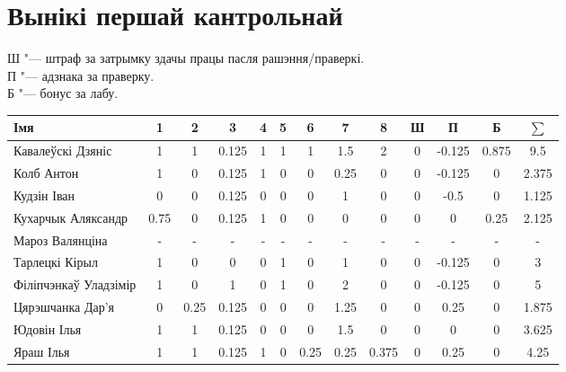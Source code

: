 


	\section{Вынікі першай кантрольнай}
	\noindent Ш "--- штраф за затрымку здачы працы пасля рашэння/праверкі. \\
	П "--- адзнака за праверку. \\
	Б "--- бонус за лабу.
\begin{table}[H]
	\begin{tabular}{|l|c|c|c|c|c|c|c|c|c|c|c|c|}
		\hline
		Імя                 & 1 & 2   & 3   & 4    & 5    & 6 & 7   & 8    & Ш   & П    & Б    & $\sum$ \\ \hline
		Кавалеўскі Дзяніс & 1 & 1 & 0.125 & 1 & 1 & 1 & 1.5 & 2 & 0  & -0.125 & 0.875 & 9.5 \\ \hline
		Колб Антон & 1 & 0 & 0.125 & 1 & 0 & 0 & 0.25 & 0 & 0 & -0.125 & 0 & 2.375 \\ \hline
		Кудзін Іван & 0 & 0 & 0.125 & 0 & 0 & 0 & 1 & 0 & 0 & -0.5 & 0 & 1.125 \\ \hline
		Кухарчык Аляксандр & 0.75 & 0 & 0.125 & 1 & 0 & 0 & 0 & 0 & 0 & 0 & 0.25 & 2.125 \\ \hline
		Мароз Валянціна & - & - & - & - & - & - & - & - & - & - & - & - \\ \hline
		Тарлецкі Кірыл & 1 & 0 & 0 & 0 & 1 & 0 & 1 & 0 & 0 & -0.125 & 0 & 3 \\ \hline
		Філіпчэнкаў Уладзімір & 1 & 0 & 1 & 0 & 1 & 0 & 2 & 0 & 0 & -0.125 & 0 & 5 \\ \hline
		Цярэшчанка Дар'я & 0 & 0.25 & 0.125 & 0 & 0 & 0 & 1.25 & 0 & 0 & 0.25 & 0 & 1.875 \\ \hline
		Юдовін Ілья & 1 & 1 & 0.125 & 0 & 0 & 0 & 1.5 & 0 & 0 & 0 & 0 & 3.625 \\ \hline
		Яраш Ілья & 1 & 1 & 0.125 & 1 & 0 & 0.25 & 0.25 & 0.375 & 0 & 0.25 & 0 & 4.25 \\ \hline
	\end{tabular}
\end{table}
	

